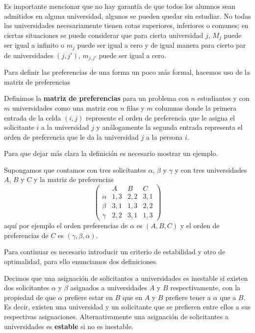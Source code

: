 Es importante mencionar que no hay garantía de que todos los alumnos sean admitidos en alguna universidad, algunos se pueden quedar sin estudiar. No todas las universidades necesariamente tienen cotas superiores, inferiores o comunes; en ciertas situaciones se puede considerar que para cierta universidad $j$, $M_{j}$ puede ser igual a infinito o $m_j$ puede ser igual a cero y de igual manera para cierto par de universidades $(j,j')$, $m_{j,j'}$ puede ser igual a cero. 

Para definir las preferencias de una forma un poco más formal, hacemos uso de la matriz de preferencias

\begin{dfn}
\label{matpref}
Definimos la \textbf{matriz de preferencias} para un problema con $n$ estudiantes y con $m$ universidades como una matriz con $n$ filas y $m$ columnas donde la primera entrada de la celda $(i,j)$ represente el orden de preferencia que le asigna el solicitante $i$ a la universidad $j$ y análogamente la segunda entrada representa el orden de preferencia que le da la universidad $j$ a la persona $i$.
\end{dfn}

Para que dejar más clara la definición es necesario mostrar un ejemplo. 

\begin{eje}
\label{ejemplo matrimonio 1}
Supongamos que contamos con tres solicitantes $\alpha$, $\beta$ y $\gamma$ y con tres universidades $A$, $B$ y $C$ y la matriz de preferencias
$$\begin{pmatrix}
& A & B & C \\
\alpha & 1,3 & 2,2 & 3,1 \\
\beta & 3,1 & 1,3 & 2,2 \\
\gamma & 2,2 & 3,1 & 1,3 
\end{pmatrix}$$
aquí por ejemplo el orden preferencias de $\alpha$ es $(A,B,C)$ y el orden de preferencias de $C$ es $(\gamma, \beta, \alpha)$.
\fin
\end{eje}


Para continuar es necesario introducir un criterio de estabilidad y otro de optimalidad, para ello enunciamos dos definiciones. 

\begin{dfn}{\cite{GaleShapley}}
\label{Estable}
Decimos que una asignación de solicitantes a universidades es inestable si existen dos solicitantes $\alpha$ y $\beta$ asignados a universidades $A$ y $B$ respectivamente, con la propiedad de que $\alpha$ prefiere estar en $B$ que en $A$ y $B$ prefiere tener a $\alpha$ que a $B$. Es decir, existen una universidad y un solicitante que se prefieren entre ellos a sus respectivas asignaciones. Alternativamente una asignación de solicitantes a universidades es \textbf{estable} si no es inestable.
\end{dfn}

